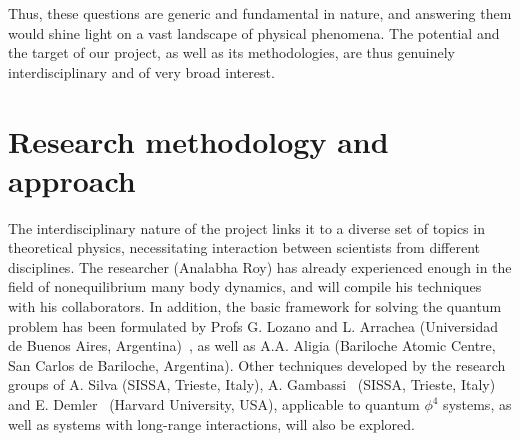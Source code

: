 \documentclass[a4paper,11pt,color]{article}
\begin{document}
Thus, these questions are generic and fundamental in nature, and answering them would shine light on a vast landscape of physical phenomena. The potential and the target of our project, as well as its methodologies, are thus genuinely interdisciplinary and of very broad interest.
 
\section{Research methodology and approach}
\label{sec:research_methodology}

The interdisciplinary nature of the project links it to  a diverse set of topics in theoretical physics, necessitating interaction between scientists from different disciplines. The researcher (Analabha Roy) has already experienced enough in the field of nonequilibrium many body dynamics, and will compile his techniques with his collaborators. In addition, the basic framework for solving the quantum problem has been formulated by Profs G. Lozano and L. Arrachea (Universidad de Buenos Aires, Argentina)~\cite{arrachea, arrachea2}, as well as A.A. Aligia (Bariloche Atomic Centre, San Carlos de Bariloche, Argentina). Other techniques developed by the research groups of A. Silva (SISSA, Trieste, Italy), A. Gambassi~\cite{gambassi,silva1} (SISSA, Trieste, Italy) and E. Demler~\cite{silva2} (Harvard University, USA), applicable to quantum $\phi^4$ systems, as well as systems with long-range interactions, will also be explored.
\end{document}
